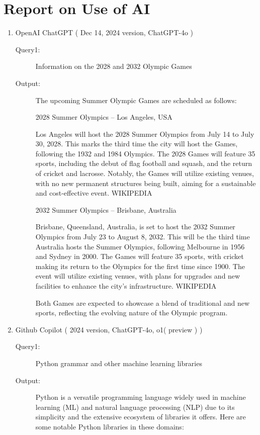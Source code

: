 \setcounter{lastpage}{\value{page}}
\thispagestyle{empty} 

\section*{Report on Use of AI}

\begin{enumerate}
\item OpenAI ChatGPT ( Dec 14, 2024 version, ChatGPT-4o ) 
\begin{description}
\item[Query1:] Information on the 2028 and 2032 Olympic Games 
\item[Output:] The upcoming Summer Olympic Games are scheduled as follows:

2028 Summer Olympics – Los Angeles, USA

Los Angeles will host the 2028 Summer Olympics from July 14 to July 30, 2028. This marks the third time the city will host the Games, following the 1932 and 1984 Olympics. The 2028 Games will feature 35 sports, including the debut of flag football and squash, and the return of cricket and lacrosse. Notably, the Games will utilize existing venues, with no new permanent structures being built, aiming for a sustainable and cost-effective event. 
WIKIPEDIA

2032 Summer Olympics – Brisbane, Australia

Brisbane, Queensland, Australia, is set to host the 2032 Summer Olympics from July 23 to August 8, 2032. This will be the third time Australia hosts the Summer Olympics, following Melbourne in 1956 and Sydney in 2000. The Games will feature 35 sports, with cricket making its return to the Olympics for the first time since 1900. The event will utilize existing venues, with plans for upgrades and new facilities to enhance the city's infrastructure. 
WIKIPEDIA

Both Games are expected to showcase a blend of traditional and new sports, reflecting the evolving nature of the Olympic program.
\end{description}
\item Github Copilot ( 2024 version, ChatGPT-4o, o1( preview ) ) 
\begin{description}
\item[Query1:] Python grammar and other machine learning libraries 
\item[Output:] Python is a versatile programming language widely used in machine learning (ML) and natural language processing (NLP) due to its simplicity and the extensive ecosystem of libraries it offers. Here are some notable Python libraries in these domains:


\end{description}
\end{enumerate}
